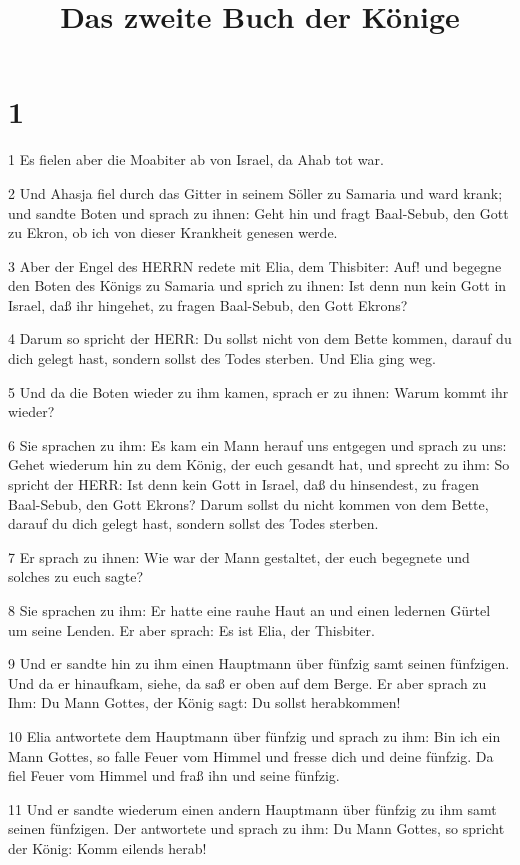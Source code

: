 

\title{Das zweite Buch der Könige}


\chapter{1}

\par 1 Es fielen aber die Moabiter ab von Israel, da Ahab tot war.
\par 2 Und Ahasja fiel durch das Gitter in seinem Söller zu Samaria und ward krank; und sandte Boten und sprach zu ihnen: Geht hin und fragt Baal-Sebub, den Gott zu Ekron, ob ich von dieser Krankheit genesen werde.
\par 3 Aber der Engel des HERRN redete mit Elia, dem Thisbiter: Auf! und begegne den Boten des Königs zu Samaria und sprich zu ihnen: Ist denn nun kein Gott in Israel, daß ihr hingehet, zu fragen Baal-Sebub, den Gott Ekrons?
\par 4 Darum so spricht der HERR: Du sollst nicht von dem Bette kommen, darauf du dich gelegt hast, sondern sollst des Todes sterben. Und Elia ging weg.
\par 5 Und da die Boten wieder zu ihm kamen, sprach er zu ihnen: Warum kommt ihr wieder?
\par 6 Sie sprachen zu ihm: Es kam ein Mann herauf uns entgegen und sprach zu uns: Gehet wiederum hin zu dem König, der euch gesandt hat, und sprecht zu ihm: So spricht der HERR: Ist denn kein Gott in Israel, daß du hinsendest, zu fragen Baal-Sebub, den Gott Ekrons? Darum sollst du nicht kommen von dem Bette, darauf du dich gelegt hast, sondern sollst des Todes sterben.
\par 7 Er sprach zu ihnen: Wie war der Mann gestaltet, der euch begegnete und solches zu euch sagte?
\par 8 Sie sprachen zu ihm: Er hatte eine rauhe Haut an und einen ledernen Gürtel um seine Lenden. Er aber sprach: Es ist Elia, der Thisbiter.
\par 9 Und er sandte hin zu ihm einen Hauptmann über fünfzig samt seinen fünfzigen. Und da er hinaufkam, siehe, da saß er oben auf dem Berge. Er aber sprach zu Ihm: Du Mann Gottes, der König sagt: Du sollst herabkommen!
\par 10 Elia antwortete dem Hauptmann über fünfzig und sprach zu ihm: Bin ich ein Mann Gottes, so falle Feuer vom Himmel und fresse dich und deine fünfzig. Da fiel Feuer vom Himmel und fraß ihn und seine fünfzig.
\par 11 Und er sandte wiederum einen andern Hauptmann über fünfzig zu ihm samt seinen fünfzigen. Der antwortete und sprach zu ihm: Du Mann Gottes, so spricht der König: Komm eilends herab!
